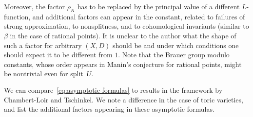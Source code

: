 \documentclass[a4paper, twoside, 10pt]{amsart}
\theoremstyle{definition}
\begin{document}
Moreover, the factor $\rho_K$ has to be replaced by the principal value of a different $L$-function, and additional factors can appear in the constant, related to failures of strong approximation, to nonsplitness, and to cohomological invariants (similar to $\beta$ in the case of rational points). It is unclear to the author what the shape of such a factor for arbitrary $(X,D)$ should be and under which conditions one should expect it to be different from $1$. Note that the Brauer group modulo constants, whose order appears in Manin's conjecture for rational points, might be nontrivial even for split~$U$.

We can compare~\eqref{eq:asymptotic-formulas} to results in the framework by Chambert-Loir and Tschinkel. We note a difference in the case of toric varieties, and list the additional factors appearing in these asymptotic formulas.
\end{document}
